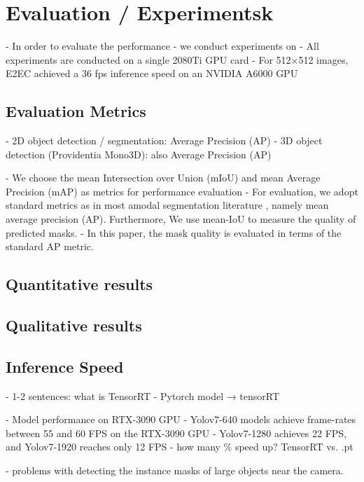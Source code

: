 \chapter{Evaluation / Experimentsk}%
- In order to evaluate the performance 
- we conduct experiments on 
- All experiments are conducted on a single 2080Ti GPU card
- For 512×512 images, E2EC achieved a 36 fps inference speed on an NVIDIA A6000 GPU

\section{Evaluation Metrics}

- 2D object detection / segmentation:  Average Precision (AP) 
- 3D object detection (Providentia Mono3D): also  Average Precision (AP) 



- We choose the mean Intersection over Union (mIoU) and mean Average Precision (mAP) as metrics for performance evaluation
- For evaluation, we adopt standard metrics as in most amodal segmentation literature , namely mean average precision (AP). Furthermore, We use mean-IoU to measure the quality of predicted masks.
- In this paper, the mask quality is evaluated in terms of the standard AP metric.

\section{Quantitative results}


\section{Qualitative results}

\section{Inference Speed}

- 1-2 sentences: what is TensorRT
- Pytorch model → tensorRT

- Model performance on RTX-3090 GPU
- Yolov7-640 models achieve frame-rates between 55 and 60 FPS on the RTX-3090 GPU
- Yolov7-1280 achieves 22 FPS, and Yolov7-1920 reaches only 12 FPS
- how many \% speed up? TensorRT vs. .pt


- problems with detecting the instance masks of large objects near the camera.
